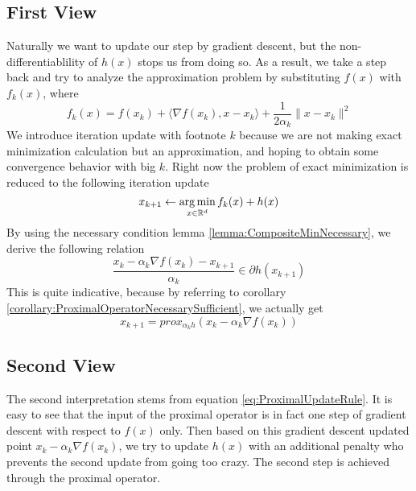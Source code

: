 \subsection*{First View}
Naturally we want to update our step by gradient descent, but the non-differentiablility of $h(x)$ stops us from doing so. As a result, we take a step back and try to analyze the approximation problem by substituting $f(x)$ with $f_k(x)$, where
\begin{equation*}
    f_k(x) = f(x_k) + \langle \nabla f(x_k), x-x_k \rangle + \frac{1}{2\alpha_k} \| x - x_k \|^2
\end{equation*}
We introduce iteration update with footnote $k$ because we are not making exact minimization calculation but an approximation, and hoping to obtain some convergence behavior with big $k$. Right now the problem of exact minimization is reduced to the following iteration update
\begin{equation*}
    x_{k+1} \leftarrow \operatorname*{arg\,min}_{x \in \mathbb{R}^d} f_k(x) + h(x)
\end{equation*}
By using the necessary condition lemma \ref{lemma:CompositeMinNecessary}, we derive the following relation
\begin{equation*}
    \frac{x_k - \alpha_k \nabla f(x_k) - x_{k+1}}{\alpha_k} \in \partial h(x_{k+1})
\end{equation*}
This is quite indicative, because by referring to corollary \ref{corollary:ProximalOperatorNecessarySufficient}, we actually get
\begin{equation}
    x_{k+1} = prox_{\alpha_k h}(x_k - \alpha_k \nabla f(x_k)) \label{eq:ProximalUpdateRule}
\end{equation}

\subsection*{Second View}
The second interpretation stems from equation \ref{eq:ProximalUpdateRule}. It is easy to see that the input of the proximal operator is in fact one step of gradient descent with respect to $f(x)$ only. Then based on this gradient descent updated point $x_k - \alpha_k \nabla f(x_k)$, we try to update $h(x)$ with an additional penalty who prevents the second update from going too crazy. The second step is achieved through the proximal operator. 


